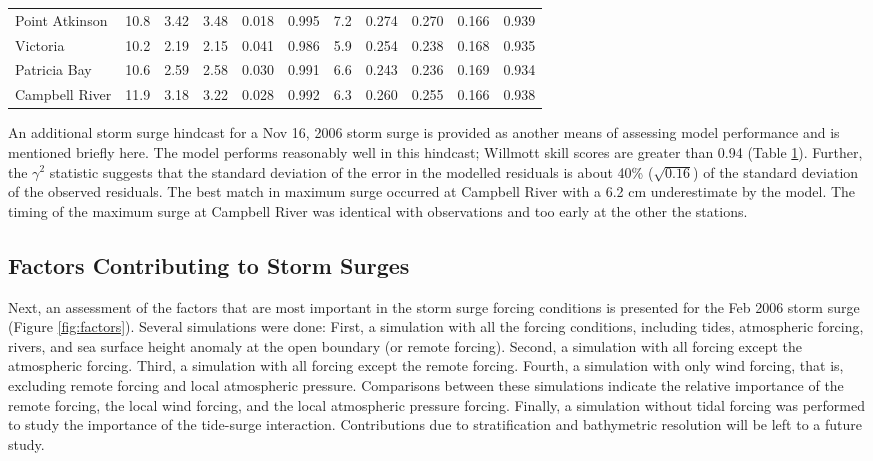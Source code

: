 \documentclass{tATO2e}
\begin{document}
\begin{table}[h]
{\begin{tabular}{|l |c c c c c | c c c c c|}
Point Atkinson &	10.8	& 3.42	& 3.48	& 0.018	& 0.995	& 7.2	& 0.274	& 0.270	& 0.166	 & 0.939 \\
Victoria       &	10.2	& 2.19	& 2.15	& 0.041	& 0.986	& 5.9	& 0.254	& 0.238	& 0.168	 & 0.935 \\
Patricia Bay   &	10.6	& 2.59	& 2.58	& 0.030	& 0.991	& 6.6	& 0.243	& 0.236	& 0.169	 & 0.934 \\
Campbell River &	11.9	& 3.18	& 3.22	& 0.028	& 0.992	& 6.3	& 0.260	& 0.255	& 0.166  & 0.938 \\
\hline
\end{tabular}}
\label{tab:statistics}
\end{table} 

An additional storm surge hindcast for a Nov 16, 2006 storm surge is provided as another means of assessing model performance and is mentioned briefly here. The model performs reasonably well in this hindcast; Willmott skill scores are greater than 0.94 (Table \ref{tab:statistics}).  Further, the $\gamma^2$ statistic suggests that the standard deviation of the error in the modelled residuals is about 40\% ($\sqrt{0.16}$) of the standard deviation of the observed residuals. The best match in maximum surge occurred at Campbell River with a 6.2 cm underestimate by the model. The timing of the maximum surge at Campbell River was identical with observations and too early at the other the stations. 


\subsection{Factors Contributing to Storm Surges}\label{sec:factors}

Next, an assessment of the factors that are most important in the storm surge forcing conditions is presented for the Feb 2006 storm surge (Figure \ref{fig:factors}). Several simulations were done: First, a simulation with all the forcing conditions, including tides, atmospheric forcing, rivers, and sea surface height anomaly at the open boundary (or remote forcing). Second, a simulation with all forcing except the atmospheric forcing. Third, a simulation with all forcing except the remote forcing. Fourth, a simulation with only wind forcing, that is, excluding remote forcing and local atmospheric pressure. Comparisons between these simulations indicate the relative importance of the remote forcing, the local wind forcing, and the local atmospheric pressure forcing. Finally, a simulation without tidal forcing was performed to study the importance of the tide-surge interaction. Contributions due to stratification and bathymetric resolution will be left to a future study. 
\end{document}
